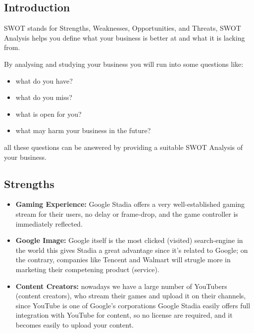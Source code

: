 \subsection{Introduction}

SWOT stands for Strengths, Weaknesses, Opportunities, and Threats, SWOT Analysis helps you define
what your business is better at and what it is lacking from.

By analysing and studying your business you will run into some questions like:
{
\renewcommand\labelitemi{}
\begin{itemize}
    \item what do you have?
    \item what do you miss?
    \item what is open for you?
    \item what may harm your business in the future?
\end{itemize}
}
all these questions can be answered by providing a suitable SWOT Analysis of your business.



\subsection{Strengths}
    \begin{itemize}
        \item \textbf{Gaming Experience:}
            Google Stadia offers a very well-established gaming stream for 
            their users, no delay or frame-drop, and the game controller is immediately reflected.
        \item \textbf{Google Image:}
            Google itself is the most clicked (visited) search-engine in the world
            this gives Stadia a great advantage since it's related to Google; on the contrary, companies
            like Tencent and Walmart will strugle more in marketing their competening product (service).
        \item \textbf{Content Creators:} 
            nowadays we have a large number of YouTubers (content creators), who stream their games and 
            upload it on their channels, since YouTube is one of Google's corporations Google Stadia
            easily offers full integration with YouTube for content, so no license are required, and 
            it becomes easily to upload your content.
    \end{itemize}

